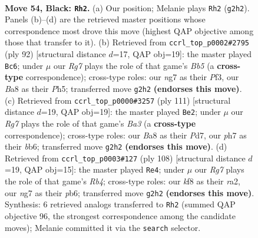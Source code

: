 \documentclass[11pt]{article}
\begin{document}
\clearpage

\begin{figure}[p]\centering
\begin{subfigure}{0.46\textwidth}\centering
\resizebox{\linewidth}{!}{%
\newchessgame
\chessboard[
  setfen={b4K2/P4pNP/2k5/4P3/8/8/5pr1/8 b - - 1 54},
  showmover=false,
  pgfstyle=straightmove, color=movearrow, markmove={g2-h2}
]}
\caption{}
\end{subfigure}\hfill
\begin{subfigure}{0.46\textwidth}\centering
\resizebox{\linewidth}{!}{%
\newchessgame
\chessboard[
  setfen={3b4/1K1P4/4k2p/1B5P/5p2/5P2/8/8 w - - 5 47},
  showmover=false,
  pgfstyle=straightmove, color=movearrow, markmove={b5-c6}
]}
\caption{}
\end{subfigure}
\\[4pt]
\begin{subfigure}{0.46\textwidth}\centering
\resizebox{\linewidth}{!}{%
\newchessgame
\chessboard[
  setfen={8/3p3k/bB1P4/6R1/Pp3r2/1K6/8/8 b - - 6 56},
  showmover=false,
  pgfstyle=straightmove, color=movearrow, markmove={a6-e2}
]}
\caption{}
\end{subfigure}\hfill
\begin{subfigure}{0.46\textwidth}\centering
\resizebox{\linewidth}{!}{%
\newchessgame
\chessboard[
  setfen={8/7p/1pk5/7P/PR6/4P3/r7/4K3 w - - 3 55},
  showmover=false,
  pgfstyle=straightmove, color=movearrow, markmove={b4-e4}
]}
\caption{}
\end{subfigure}
\caption{\textbf{Move 54, Black: \texttt{Rh2}.} (a) Our position; Melanie plays \texttt{Rh2} (\texttt{g2h2}). Panels (b)--(d) are the retrieved master positions whose correspondence most drove this move (highest QAP objective among those that transfer to it). (b) Retrieved from \texttt{ccrl\_top\_p0002\#2795} (ply 92) [structural distance $d$=17, QAP obj=19]: the master played \texttt{Bc6}; under $\mu$ our \emph{Rg7} plays the role of that game's \emph{Bb5} (a \textbf{cross-type} correspondence); cross-type roles: our \emph{n}g7 as their \emph{P}f3, our \emph{B}a8 as their \emph{P}h5; transferred move \texttt{g2h2} \textbf{(endorses this move)}. (c) Retrieved from \texttt{ccrl\_top\_p0000\#3257} (ply 111) [structural distance $d$=19, QAP obj=19]: the master played \texttt{Be2}; under $\mu$ our \emph{Rg7} plays the role of that game's \emph{Ba3} (a \textbf{cross-type} correspondence); cross-type roles: our \emph{B}a8 as their \emph{P}d7, our \emph{p}h7 as their \emph{b}b6; transferred move \texttt{g2h2} \textbf{(endorses this move)}. (d) Retrieved from \texttt{ccrl\_top\_p0003\#127} (ply 108) [structural distance $d$=19, QAP obj=15]: the master played \texttt{Re4}; under $\mu$ our \emph{Rg7} plays the role of that game's \emph{Rb4}; cross-type roles: our \emph{k}f8 as their \emph{r}a2, our \emph{n}g7 as their \emph{p}b6; transferred move \texttt{g2h2} \textbf{(endorses this move)}. Synthesis: 6 retrieved analogs transferred to \texttt{Rh2} (summed QAP objective 96, the strongest correspondence among the candidate moves); Melanie committed it via the \texttt{search} selector.}
\label{fig:thought-m107}
\end{figure}
\end{document}
